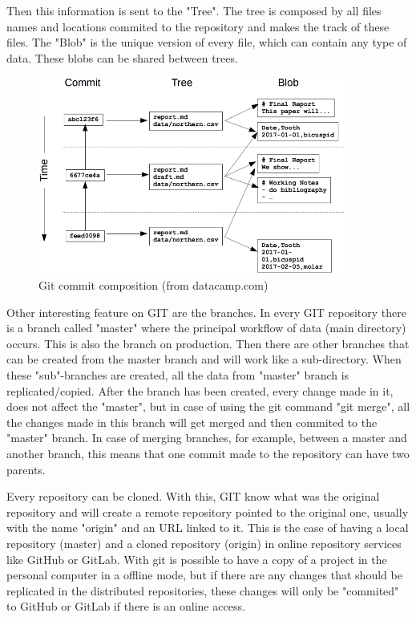 \documentclass[mim_thesis.tex]{subfiles}
\begin{document}
Then this information is sent to the "Tree". The tree is composed by all files names and locations commited to the repository and makes the track of these files. The "Blob" is the unique version of every file, which can contain any type of data. These blobs can be shared between trees.

\begin{figure}[H]
	\centering
    \includegraphics[width=0.9\textwidth]{img/git_commit_areas.PNG}
	\caption{Git commit composition (from datacamp.com)}
	\label{fig:git_commit_areas}
\end{figure}

Other interesting feature on GIT are the branches. In every GIT repository there is a branch called "master" where the principal workflow of data (main directory) occurs. This is also the branch on production. Then there are other branches that can be created from the master branch and will work like a sub-directory. When these "sub"-branches are created, all the data from "master" branch is replicated/copied. After the branch has been created, every change made in it, does not affect the "master", but in case of using the git command "git merge", all the changes made in this branch will get merged and then commited to the "master" branch. In case of merging branches, for example, between a master and another branch, this means that one commit made to the repository can have two parents. 

Every repository can be cloned. With this, GIT know what was the original repository and will create a remote repository pointed to the original one, usually with the name "origin" and an \ac{URL} linked to it. This is the case of having a local repository (master) and a cloned repository (origin) in online repository services like GitHub or GitLab. With git is possible to have a copy of a project in the personal computer in a offline mode, but if there are any changes that should be replicated in the distributed repositories, these changes will only be "commited" to GitHub or GitLab if there is an online access.   
\end{document}
